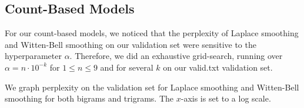 \documentclass[11pt]{article}
\begin{document}
\subsection{Count-Based Models}


For our count-based models, we noticed that the perplexity of Laplace smoothing and Witten-Bell smoothing on our validation set were sensitive to the hyperparameter $\alpha$. Therefore, we did an exhaustive grid-search, running over $\alpha = n \cdot 10^{-k}$ for $1 \leq n \leq 9$ and for several $k$ on our valid.txt validation set. 

We graph perplexity on the validation set for Laplace smoothing and Witten-Bell smoothing for both bigrams and trigrams. The $x$-axis is set to a log scale. 

\begin{figure}
\centering
{}
\hfill

\end{figure}
\end{document}

